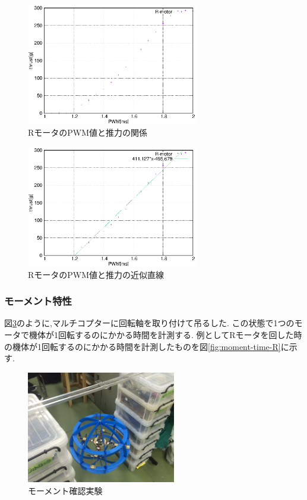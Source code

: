 \documentclass[12pt,oneside]{sotsuken_paper}
\begin{document}
\begin{figure}[htbp]
	\begin{center}
		\includegraphics[width=75mm]{image/thrust/thrust-R.eps}
		\caption{RモータのPWM値と推力の関係}
		\label{fig:thrust-R}
	\end{center}
\end{figure}

\begin{figure}[htbp]
	\begin{center}
		\includegraphics[width=75mm]{image/thrust/thrust-R-kinji.eps}
		\caption{RモータのPWM値と推力の近似直線}
		\label{fig:thrust-R-kinji}
	\end{center}
\end{figure}

\subsubsection{モーメント特性}
図\ref{fig:moment-test}のように,マルチコプターに回転軸を取り付けて吊るした.
この状態で1つのモータで機体が1回転するのにかかる時間を計測する.
例としてRモータを回した時の機体が1回転するのにかかる時間を計測したものを図\ref{fig:moment-time-R}に示す.

\begin{figure}[htbp]
	\begin{center}
		\includegraphics[width=65mm]{image/moment/moment-test.jpg}
		\caption{モーメント確認実験}
		\label{fig:moment-test}
	\end{center}
\end{figure}
\end{document}

